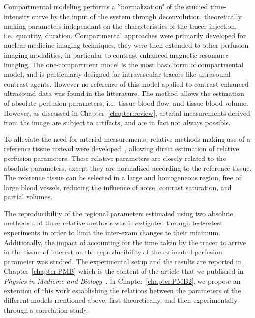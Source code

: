 Compartmental modeling performs a \``normalization\'' of the studied time-intensity curve by the input of the system through deconvolution, theoretically making parameters independant on the characteristics of the tracer injection, i.e.~quantity, duration.
Compartmental approaches were primarily developed for nuclear medicine imaging techniques, they were then extended to other perfusion imaging modalities, in particular to contrast-enhanced magnetic resonance imaging.
The one-compartment model is the most basic form of compartmental model, and is particularly designed for intravascular tracers like ultrasound contrast agents. 
However no reference of this model applied to contrast-enhanced ultrasound data was found in the litterature.
The method allows the estimation of absolute perfusion parameters, i.e.~tissue blood flow, and tissue blood volume.
However, as discussed in Chapter~\ref{chapter:review}, arterial measurements derived from the image are subject to artifacts, and are in fact not always possible.

To alleviate the need for arterial measurements, relative methods making use of a reference tissue instead were developed~\cite{Yankeelov:2005dea}, allowing direct estimation of relative perfusion parameters.
These relative parameters are closely related to the absolute parameters, except they are normalized according to the reference tissue.
The reference tissue can be selected in a large and homogeneous region, free of large blood vessels, reducing the influence of noise, contrast saturation, and partial volumes.

The reproducibility of the regional parameters estimated using two absolute methods and three relative methods was investigated through test-retest experiments in order to limit the inter-exam changes to their minimum.
Additionally, the impact of accounting for the time taken by the tracer to arrive in the tissue of interest on the reproducibility of the estimated perfusion parameter was studied. 
The experimental setup and the results are reported in Chapter~\ref{chapter:PMB} which is the content of the article that we published in {\em Physics in Medicine and Biology}~\cite{Doury:2017fz}.
In Chapter~\ref{chapter:PMB2}, we propose an extention of this work establishing the relations between the parameters of the different models mentioned above, first theoretically, and then experimentally through a correlation study.
